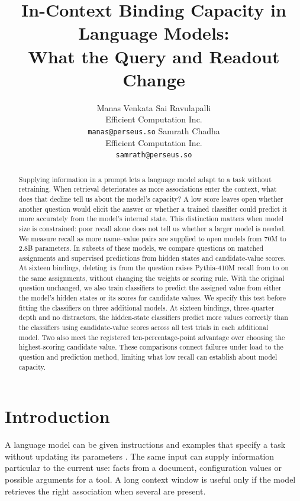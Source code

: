 \documentclass{article}
\title{In-Context Binding Capacity in Language Models:\\ What the Query and Readout Change}
\author{%
  Manas Venkata Sai Ravulapalli\\
  Efficient Computation Inc.\\
  \texttt{manas@perseus.so}
  \And
  Samrath Chadha\\
  Efficient Computation Inc.\\
  \texttt{samrath@perseus.so}
}
\begin{document}
\maketitle

\begin{abstract}
Supplying information in a prompt lets a language model adapt to a task without retraining.
When retrieval deteriorates as more associations enter the context, what does that decline tell us about the model's capacity?
A low score leaves open whether another question would elicit the answer or whether a trained classifier could predict it more accurately from the model's internal state.
This distinction matters when model size is constrained: poor recall alone does not tell us whether a larger model is needed.
We measure recall as more name--value pairs are supplied to \NewNModels{} open models from 70M to 2.8B parameters.
In subsets of these models, we compare questions on matched assignments and supervised predictions from hidden states and candidate-value scores.
At sixteen bindings, deleting \texttt{is} from the question raises Pythia-410M recall from \NewFourTenOriginal{} to \NewFourTenColon{} on the same assignments, without changing the weights or scoring rule.
With the original question unchanged, we also train classifiers to predict the assigned value from either the model's hidden states or its scores for candidate values.
We specify this test before fitting the classifiers on three additional models.
At sixteen bindings, three-quarter depth and no distractors, the hidden-state classifiers predict more values correctly than the classifiers using candidate-value scores across all test trials in each additional model.
Two also meet the registered ten-percentage-point advantage over choosing the highest-scoring candidate value.
These comparisons connect failures under load to the question and prediction method, limiting what low recall can establish about model capacity.
\end{abstract}

\section{Introduction}\label{sec:intro}
A language model can be given instructions and examples that specify a task without updating its parameters \citep{brown2020}.
The same input can supply information particular to the current use: facts from a document, configuration values or possible arguments for a tool.
A long context window is useful only if the model retrieves the right association when several are present.
\end{document}
